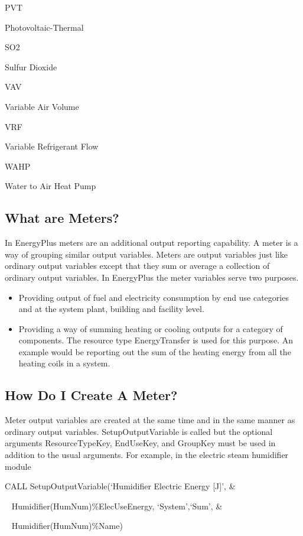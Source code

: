 PVT

Photovoltaic-Thermal

SO2

Sulfur Dioxide

VAV

Variable Air Volume

VRF

Variable Refrigerant Flow

WAHP

Water to Air Heat Pump

\subsection{What are Meters?}\label{what-are-meters}

In EnergyPlus meters are an additional output reporting capability. A meter is a way of grouping similar output variables. Meters are output variables just like ordinary output variables except that they sum or average a collection of ordinary output variables. In EnergyPlus the meter variables serve two purposes.

\begin{itemize}
\item
  Providing output of fuel and electricity consumption by end use categories and at the system plant, building and facility level.
\item
  Providing a way of summing heating or cooling outputs for a category of components. The resource type EnergyTransfer is used for this purpose. An example would be reporting out the sum of the heating energy from all the heating coils in a system.
\end{itemize}

\subsection{How Do I Create A Meter?}\label{how-do-i-create-a-meter}

Meter output variables are created at the same time and in the same manner as ordinary output variables. SetupOutputVariable is called but the optional arguments ResourceTypeKey, EndUseKey, and GroupKey must be used in addition to the usual arguments. For example, in the electric steam humidifier module

CALL SetupOutputVariable(`Humidifier Electric Energy {[}J{]}', \&

~ Humidifier(HumNum)\%ElecUseEnergy, `System',`Sum', \&

~ Humidifier(HumNum)\%Name)

